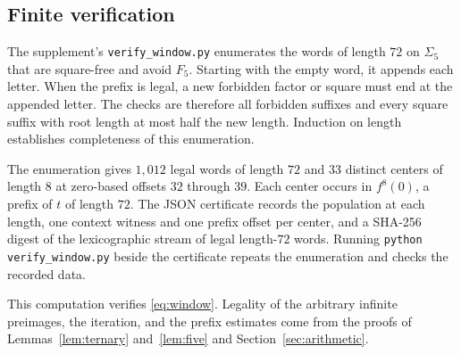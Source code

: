 \subsection{Finite verification}\label{sec:computation}

The supplement's \texttt{verify\_window.py} enumerates the words
of length \(72\) on \(\Sigma_5\) that are square-free and avoid
\(F_5\). Starting with the empty word, it appends each letter.
When the prefix is legal, a new forbidden factor or square must
end at the appended letter. The checks are therefore all
forbidden suffixes and every square suffix with root length at
most half the new length. Induction on length establishes
completeness of this enumeration.

The enumeration gives \(1{,}012\) legal words of length \(72\)
and \(33\) distinct centers of length \(8\) at zero-based offsets
\(32\) through \(39\). Each center occurs in \(f^8(0)\), a prefix
of \(t\) of length \(72\). The JSON certificate records the
population at each length, one context witness and one prefix
offset per center, and a SHA-256 digest of the lexicographic stream
of legal length-\(72\) words. Running
\texttt{python verify\_window.py} beside the certificate repeats
the enumeration and checks the recorded data.

This computation verifies \eqref{eq:window}. Legality of the
arbitrary infinite preimages, the iteration, and the prefix
estimates come from the proofs of Lemmas~\ref{lem:ternary}
and~\ref{lem:five} and Section~\ref{sec:arithmetic}.

